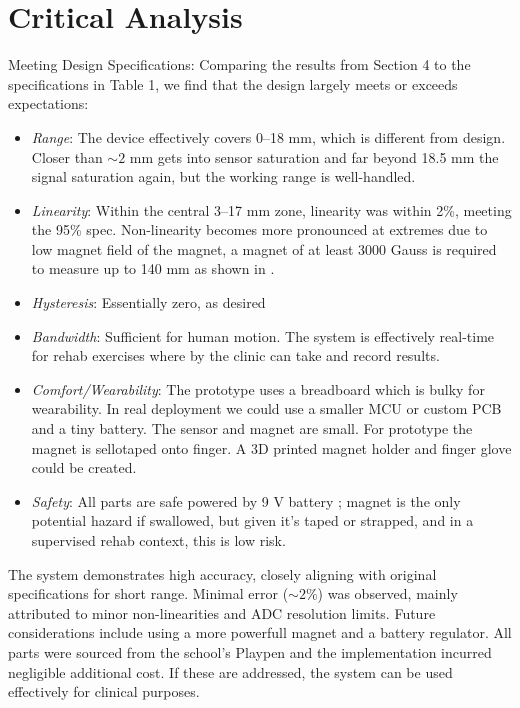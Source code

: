 \documentclass[a4paper,12pt]{article}
\begin{document}
\section{Critical Analysis}
Meeting Design Specifications: Comparing the results from Section 4 to the specifications in Table 1, we find that the design largely meets or exceeds expectations:
\begin{itemize}
	\item \emph{Range}: The device effectively covers 0–18 mm, which is different from design. Closer than $\sim 2$ mm gets into sensor saturation and far beyond 18.5 mm the signal saturation again, but the working range is well-handled.
	\item \emph{Linearity}: Within the central 3–17 mm zone, linearity was within 2\%, meeting the 95\% spec. Non-linearity becomes more pronounced at extremes due to low magnet field of the magnet, a magnet of at least 3000 Gauss is required to measure up to 140 mm as shown in \cite{gao2010design}.
	\item \emph{Hysteresis}: Essentially zero, as desired
	\item \emph{Bandwidth}: Sufficient for human motion. The system is effectively real-time for rehab exercises where by the clinic can take and record results.
	\item \emph{Comfort/Wearability}: The prototype uses a breadboard which is bulky for wearability. In real deployment we could use a smaller MCU or custom PCB and a tiny battery. The sensor and magnet are small. For prototype the magnet is sellotaped onto finger. A 3D printed magnet holder and finger glove could be created.
	\item \emph{Safety}: All parts are safe powered by 9 V battery \cite{EEStackExchange2019}; magnet is the only potential hazard if swallowed, but given it’s taped or strapped, and in a supervised rehab context, this is low risk.
\end{itemize}
\noindent
The system demonstrates high accuracy, closely aligning with original specifications for short range. Minimal error ($\sim 2\%$) was observed, mainly attributed to minor non-linearities and ADC resolution limits. Future considerations include using a more powerfull magnet \cite{gao2010design} and a battery regulator. All parts were sourced from the school's Playpen and the implementation incurred negligible additional cost. If these are addressed, the system can be used effectively for clinical purposes.


%
\end{document}
